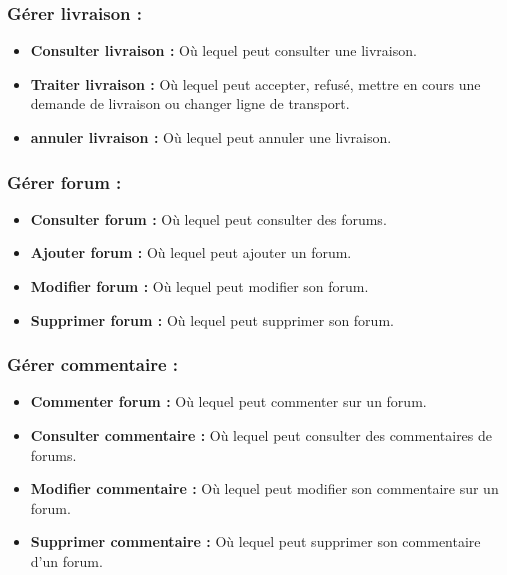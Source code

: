 \documentclass[16pt,fleqn]{article} %
\begin{document}
\subsubsection{Gérer livraison :}
    \begin{itemize}
        \item \textbf{Consulter livraison :} Où lequel peut consulter une livraison.
        \item \textbf{Traiter livraison :} Où lequel peut accepter, refusé, mettre en cours une demande de livraison ou changer ligne de transport.
        \item \textbf{annuler livraison :} Où lequel peut annuler une livraison.
    \end{itemize}
    
\subsubsection{Gérer forum :}
    \begin{itemize}
        \item \textbf{Consulter forum :} Où lequel peut consulter des forums.
        \item \textbf{Ajouter forum :} Où lequel peut ajouter un forum.
        \item \textbf{Modifier forum :} Où lequel peut modifier son forum.
        \item \textbf{Supprimer forum :} Où lequel peut supprimer son forum.
    \end{itemize}
    
\subsubsection{Gérer commentaire :}
    \begin{itemize}
        \item \textbf{Commenter forum :} Où lequel peut commenter sur un forum.
        \item \textbf{Consulter commentaire :} Où lequel peut consulter des commentaires de forums.
        \item \textbf{Modifier commentaire :} Où lequel peut modifier son commentaire sur un forum.
        \item \textbf{Supprimer commentaire :} Où lequel peut supprimer son commentaire d'un forum.
    \end{itemize}
    
\end{document}
